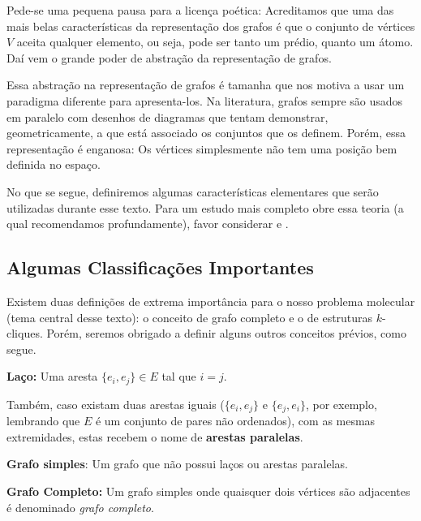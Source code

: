 \documentclass[a4paper,12pt]{article}
\begin{document}
	Pede-se uma pequena pausa para a licença poética: Acreditamos que uma das mais belas características da representação dos grafos é que o conjunto de vértices $V$ aceita qualquer elemento, ou seja, pode ser tanto um prédio, quanto um átomo. Daí vem o grande poder de abstração da representação de grafos. 
	
	Essa abstração na representação de grafos é tamanha que nos motiva a usar um paradigma diferente para apresenta-los. Na literatura, grafos sempre são usados em paralelo com desenhos de diagramas que tentam demonstrar, geometricamente, a que está associado os conjuntos que os definem. Porém, essa representação é enganosa: Os vértices simplesmente não tem uma posição bem definida no espaço.
	
	No que se segue, definiremos algumas características elementares que serão utilizadas durante esse texto. Para um estudo mais completo obre essa teoria (a qual recomendamos profundamente), favor considerar \cite{grafos1} e \cite{grafosPremioElon}.
	
	\subsection{Algumas Classificações Importantes}
	
	Existem duas definições de extrema importância para o nosso problema molecular (tema central desse texto): o conceito de grafo completo e o de estruturas $k$-cliques. Porém, seremos obrigado a definir alguns outros conceitos prévios, como segue. 
	
	
	\begin{center}
		\begin{minipage}{0.9 \linewidth}
			\textbf{Laço:} Uma aresta $\{e_i, e_j\} \in E$ tal que $i = j$.
		\end{minipage}
	\end{center}

	Também, caso existam duas arestas iguais ($\{e_i, e_j\}$ e 
	$\{e_j, e_i\}$, por exemplo, lembrando que $E$ é um conjunto de pares não ordenados), com as mesmas extremidades, estas recebem o nome de \textbf{arestas paralelas}.

	\begin{center}
		\begin{minipage}{0.9 \linewidth}
			\textbf{Grafo simples}: Um grafo que não possui laços ou arestas paralelas.
		\end{minipage}
	\end{center}
	
	\begin{center}
		\begin{minipage}{0.9 \linewidth}
			\textbf{Grafo Completo:} Um grafo simples onde quaisquer dois vértices são adjacentes é denominado \textit{grafo completo}.
		\end{minipage}
	\end{center}
	
\end{document}
